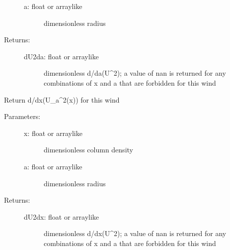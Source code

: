 \documentclass[letterpaper,10pt,english]{sphinxmanual}
\begin{document}
\begin{fulllineitems}
\begin{fulllineitems}
\begin{description}
\begin{description}
\item[{a: float or arraylike}] \leavevmode
dimensionless radius

\end{description}

\item[{Returns:}] \leavevmode\begin{description}
\item[{dU2da: float or arraylike}] \leavevmode
dimensionless d/da(U\textasciicircum{}2); a value of nan is returned
for any combinations of x and a that are forbidden for
this wind

\end{description}

\end{description}

\end{fulllineitems}


\begin{fulllineitems}
\label{fulldoc:despotic.winds.pwind.dU2dx}
Return d/dx(U\_a\textasciicircum{}2(x)) for this wind
\begin{description}
\item[{Parameters:}] \leavevmode\begin{description}
\item[{x: float or arraylike}] \leavevmode
dimensionless column density

\item[{a: float or arraylike}] \leavevmode
dimensionless radius

\end{description}

\item[{Returns:}] \leavevmode\begin{description}
\item[{dU2dx: float or arraylike}] \leavevmode
dimensionless d/dx(U\textasciicircum{}2); a value of nan is returned
for any combinations of x and a that are forbidden for
this wind

\end{description}

\end{description}

\end{fulllineitems}



\end{fulllineitems}
\end{document}
